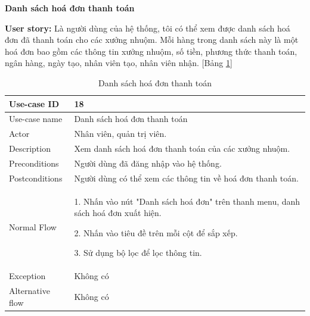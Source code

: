 \textbf{Danh sách hoá đơn thanh toán}\par
\textbf{User story:} Là người dùng của hệ thống, tôi có thể xem được danh sách hoá đơn đã thanh toán cho các xưởng nhuộm. Mỗi hàng trong danh sách này là một hoá đơn bao gồm các thông tin xưởng nhuộm, số tiền, phương thức thanh toán, ngân hàng, ngày tạo, nhân viên tạo, nhân viên nhận. [Bảng \ref{bang18}]
\begin{table}[H]
    \centering
    \begin{tabular}{|m{3cm}|m{10cm}|}
    \hline 
        Use-case ID & 18\\ \hline
        Use-case name & Danh sách hoá đơn thanh toán\\ \hline
        Actor & Nhân viên, quản trị viên.\\ \hline
        Description & Xem danh sách hoá đơn thanh toán của các xưởng nhuộm.\\ \hline
        Preconditions & Người dùng đã đăng nhập vào hệ thống.\\ \hline
        Postconditions & Người dùng có thể xem các thông tin về hoá đơn thanh toán.\\ \hline
        Normal Flow & 
        1. Nhấn vào nút "Danh sách hoá đơn" trên thanh menu, danh sách hoá đơn xuất hiện.\par
        2. Nhấn vào tiêu đề trên mỗi cột để sắp xếp.\par
        3. Sử dụng bộ lọc để lọc thông tin.
        \\ \hline
        Exception & Không có\\ \hline
        Alternative flow & Không có\\ 
    \hline 
    \end{tabular}
    \caption{Danh sách hoá đơn thanh toán}
    \label{bang18}
\end{table}

